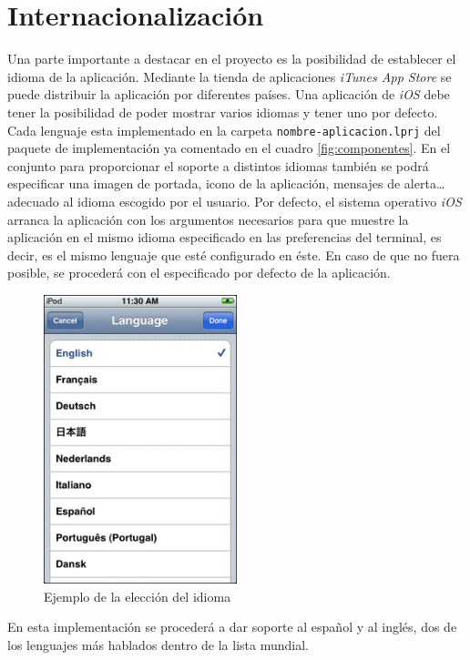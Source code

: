 \section{Internacionalización}
 Una parte importante a destacar en el proyecto es la posibilidad de establecer el idioma de la aplicación. Mediante la tienda de aplicaciones \emph{iTunes App Store} se puede distribuir la aplicación por diferentes países. Una aplicación de \emph{iOS} debe tener la posibilidad de poder mostrar varios idiomas y tener uno por defecto. Cada lenguaje esta implementado en la carpeta \lstinline!nombre-aplicacion.lprj! del paquete de implementación ya comentado en el cuadro \ref{fig:componentes}. En el conjunto para proporcionar el soporte a distintos idiomas también se podrá especificar una imagen de portada, icono de la aplicación, mensajes de alerta\ldots  adecuado al idioma escogido por el usuario. Por defecto, el sistema operativo \emph{iOS} arranca la aplicación con los argumentos necesarios para que muestre la aplicación en el mismo idioma especificado en las preferencias del terminal, es decir, es el mismo lenguaje que esté configurado en éste. En caso de que no fuera posible, se procederá con el especificado por defecto de la aplicación.

  \begin{figure}[h!]
    \centering
       \includegraphics[width=0.5\textwidth]{./images/language.jpg}
     \caption{Ejemplo de la elección del idioma }
   \label{fig:Vista de las preferencias del idioma}
\end{figure}

 
  En esta implementación se procederá a dar soporte al español y al inglés, dos de los lenguajes más hablados dentro de la lista mundial.
  

